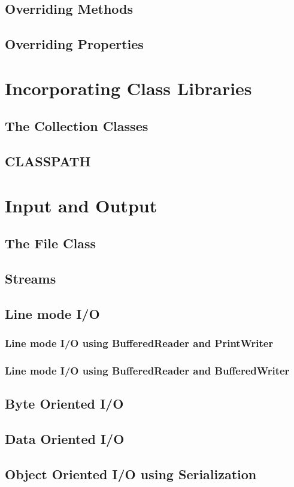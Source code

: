 \documentclass[10pt]{book}
\begin{document}
\section{Overriding Methods}
\section{Overriding Properties}
\chapter{Incorporating Class Libraries}
\section{The Collection Classes}
\section{CLASSPATH}
\chapter{Input and Output}
\section{The File Class}
\section{Streams}
\section{Line mode I/O}
\subsection{Line mode I/O using BufferedReader and PrintWriter}
\subsection{Line mode I/O using BufferedReader and BufferedWriter}
\section{Byte Oriented I/O}
\section{Data Oriented I/O}
\section{Object Oriented I/O using Serialization}
\end{document}
